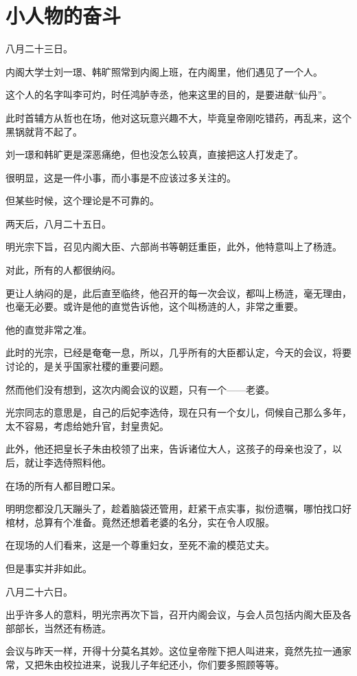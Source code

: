 \section{小人物的奋斗}
\ifnum{}
	\begin{multicols}{\theparacolNo}
		\fi
		八月二十三日。

		内阁大学士刘一璟、韩旷照常到内阁上班，在内阁里，他们遇见了一个人。

		这个人的名字叫李可灼，时任鸿胪寺丞，他来这里的目的，是要进献“仙丹”。

		此时首辅方从哲也在场，他对这玩意兴趣不大，毕竟皇帝刚吃错药，再乱来，这个黑锅就背不起了。

		刘一璟和韩旷更是深恶痛绝，但也没怎么较真，直接把这人打发走了。

		很明显，这是一件小事，而小事是不应该过多关注的。

		但某些时候，这个理论是不可靠的。

		两天后，八月二十五日。

		明光宗下旨，召见内阁大臣、六部尚书等朝廷重臣，此外，他特意叫上了杨涟。

		对此，所有的人都很纳闷。

		更让人纳闷的是，此后直至临终，他召开的每一次会议，都叫上杨涟，毫无理由，也毫无必要。或许是他的直觉告诉他，这个叫杨涟的人，非常之重要。

		他的直觉非常之准。

		此时的光宗，已经是奄奄一息，所以，几乎所有的大臣都认定，今天的会议，将要讨论的，是关乎国家社稷的重要问题。

		然而他们没有想到，这次内阁会议的议题，只有一个——老婆。

		光宗同志的意思是，自己的后妃李选侍，现在只有一个女儿，伺候自己那么多年，太不容易，考虑给她升官，封皇贵妃。

		此外，他还把皇长子朱由校领了出来，告诉诸位大人，这孩子的母亲也没了，以后，就让李选侍照料他。

		在场的所有人都目瞪口呆。

		明明您都没几天蹦头了，趁着脑袋还管用，赶紧干点实事，拟份遗嘱，哪怕找口好棺材，总算有个准备。竟然还想着老婆的名分，实在令人叹服。

		在现场的人们看来，这是一个尊重妇女，至死不渝的模范丈夫。

		但是事实并非如此。

		八月二十六日。

		出乎许多人的意料，明光宗再次下旨，召开内阁会议，与会人员包括内阁大臣及各部部长，当然还有杨涟。

		会议与昨天一样，开得十分莫名其妙。这位皇帝陛下把人叫进来，竟然先拉一通家常，又把朱由校拉进来，说我儿子年纪还小，你们要多照顾等等。


\end{multicols}
